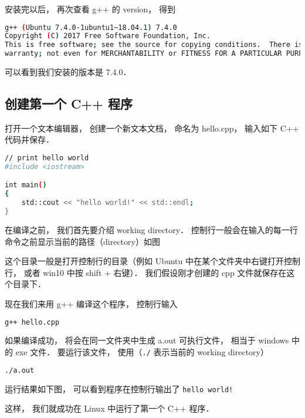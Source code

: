 安装完以后， 再次查看 g++ 的 version， 得到
\begin{lstlisting}[language=bash]
g++ (Ubuntu 7.4.0-1ubuntu1~18.04.1) 7.4.0
Copyright (C) 2017 Free Software Foundation, Inc.
This is free software; see the source for copying conditions.  There is NO
warranty; not even for MERCHANTABILITY or FITNESS FOR A PARTICULAR PURPOSE.
\end{lstlisting}
可以看到我们安装的版本是 7.4.0．


\subsection{创建第一个 C++ 程序}
打开一个文本编辑器， 创建一个新文本文档， 命名为 hello.cpp， 输入如下 C++ 代码并保存．
\begin{lstlisting}[language=bash]
// print hello world
#include <iostream>

int main()
{
    std::cout << "hello world!" << std::endl;
}
\end{lstlisting}
在编译之前， 我们首先要介绍 working directory． 控制行一般会在输入的每一行命令之前显示当前的路径（directory）如图


这个目录一般是打开控制行的目录（例如 Ubuntu 中在某个文件夹中右键打开控制行， 或者 win10 中按 shift + 右键）． 我们假设刚才创建的 cpp 文件就保存在这个目录下．

现在我们来用 g++ 编译这个程序， 控制行输入
\begin{lstlisting}[language=bash]
g++ hello.cpp
\end{lstlisting}
如果编译成功， 将会在同一文件夹中生成 a.out 可执行文件， 相当于 windows 中的 exe 文件． 要运行该文件， 使用（\lstinline|./| 表示当前的 working directory）
\begin{lstlisting}[language=bash]
./a.out
\end{lstlisting}
运行结果如下图， 可以看到程序在控制行输出了 \lstinline|hello world!|


这样， 我们就成功在 Linux 中运行了第一个 C++ 程序．
